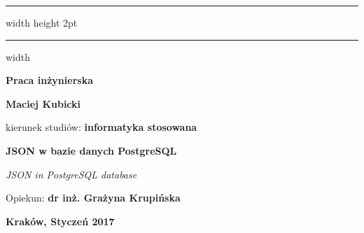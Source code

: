 \documentclass[a4paper,12pt,table]{article}
\begin{document}
\begin{titlepage}
\hrule width \hsize height 2pt \kern 1mm \hrule width \hsize  

\vspace*{2.5 cm}
\begin{center}
{\Huge \textbf{Praca inżynierska}}
\end{center}

\vspace*{1 cm}
\begin{center}
{\Large \textbf{Maciej Kubicki}}
\end{center}
\renewcommand{\sfdefault}{phv}
\begin{center}
{kierunek studiów: \textbf{informatyka stosowana}}
\end{center}


\vspace*{2 cm}
\begin{center}
{\huge \textbf{JSON w bazie danych PostgreSQL}}
\end{center}

\begin{center}
{\large \textit{JSON in PostgreSQL database}}
\end{center}

\vspace*{1.5 cm}
{\large Opiekun: \textbf{dr inż. Grażyna Krupińska}}


\vspace*{6.0 cm}
{\textbf{Kraków, Styczeń 2017}}\\[3cm] %



\end{titlepage}
\end{document}
